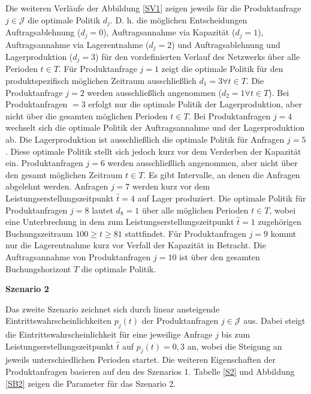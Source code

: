 Die weiteren Verläufe der Abbildung \ref{SV1} zeigen jeweils für die Produktanfrage $j\in\mathcal{J}$ die optimale Politik $d_j$. D. h. die möglichen Entscheidungen \glqq Auftragsablehnung ($d_j=0$){\grqq}, \glqq Auftragsannahme via Kapazität ($d_j=1$){\grqq}, \glqq Auftragsannahme via Lagerentnahme ($d_j=2$){\grqq} und \glqq Auftragsablehnung und Lagerproduktion ($d_j=3$){\grqq} für den vordefinierten Verlauf des Netzwerks über alle Perioden $t\in T$. Für Produktanfrage $j=1$ zeigt die optimale Politik für den produktspezifisch möglichen Zeitraum ausschließlich $d_1=3\forall t\in T$. Die Produktanfrage $j=2$ werden ausschließlich angenommen ($d_2=1\forall t \in T$). Bei Produktanfragen $=3$ erfolgt nur die optimale Politik der Lagerproduktion, aber nicht über die gesamten möglichen Perioden $t\in T$. Bei Produktanfragen $j=4$ wechselt sich die optimale Politik  der Auftragsannahme und der Lagerproduktion ab. Die Lagerproduktion ist ausschließlich die optimale Politik für Anfragen $j=5$. Diese optimale Politik stellt sich jedoch kurz vor dem Verderben der Kapazität ein. Produktanfragen $j=6$ werden ausschließlich angenommen, aber nicht über den gesamt möglichen Zeitraum $t\in T$. Es gibt Intervalle, an denen die Anfragen abgelehnt werden. Anfragen $j=7$ werden kurz vor dem Leistungserstellungszeitpunkt $\hat t=4$ auf Lager produziert. Die optimale Politik für Produktanfragen $j=8$ lautet $d_8=1$ über alle möglichen Perioden $t\in T$, wobei eine Unterbrechung in dem zum Leistungserstellungszeitpunkt $\hat t=1$ zugehörigen Buchungszeitraum $100\ge t \ge 81$ stattfindet. Für Produktanfragen $j=9$ kommt nur die Lagerentnahme kurz vor Verfall der Kapazität in Betracht. Die Auftragsannahme von Produktanfragen $j=10$ ist über den gesamten Buchungshorizont $T$ die optimale Politik.

\textbf{Szenario 2}

Das zweite Szenario zeichnet sich durch linear ansteigende Eintrittswahrscheinlichkeiten $p_j(t)$ der Produktanfragen $j\in\mathcal{J}$ aus. Dabei steigt die Eintrittswahrscheinlichkeit für eine jeweilige Anfrage $j$ bis zum Leistungserstellungszeitpunkt $\hat t$ auf $p_j(t)=0,3$ an, wobei die Steigung an jeweils unterschiedlichen Perioden startet. Die weiteren Eigenschaften der Produktanfragen basieren auf den des Szenarios 1. Tabelle \ref{S2} und Abbildung \ref{SB2} zeigen die Parameter für das Szenario 2.

